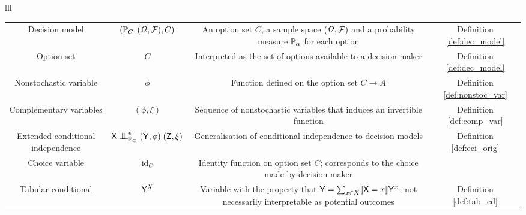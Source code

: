 \begin{symbols}{lll}
\begin{tabular}{ |c|c|c|c|}
Decision model & $(\mathbb{P}_C,(\Omega,\mathcal{F}),C)$ & An option set $C$, a sample space $(\Omega,\mathcal{F})$ and a probability measure $\mathbb{P}_\alpha$ for each option & Definition \ref{def:dec_model}\\
Option set & $C$ & Interpreted as the set of options available to a decision maker & Definition \ref{def:dec_model}\\
Nonstochastic variable & $\phi$ & Function defined on the option set $C\to A$ & Definition \ref{def:nonstoc_var}\\
Complementary variables & $(\phi,\xi)$ & Sequence of nonstochastic variables that induces an invertible function & Definition \ref{def:comp_var}\\
Extended conditional independence & $\RV{X}\CI^e_{\prob{P}_C}(\RV{Y},\phi)|(\RV{Z},\xi)$ & Generalisation of conditional independence to decision models & Definition \ref{def:eci_orig}\\
Choice variable & $\text{id}_C$ & Identity function on option set $C$; corresponds to the choice made by decision maker & \\
Tabular conditional & $\mathsf{Y}^X$ & Variable with the property that $\mathsf{Y}=\sum_{x\in X} \llbracket \mathsf{X}=x\rrbracket \mathsf{Y}^x$; not necessarily interpretable as potential outcomes & Definition \ref{def:tab_cd}\\
\hline
\end{tabular}

\end{symbols}




